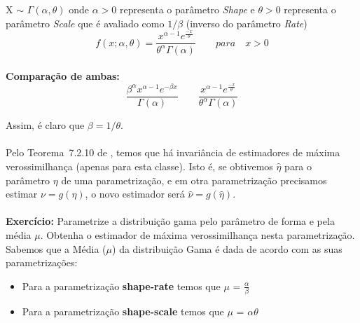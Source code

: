 X $\sim$ \begin{math} \Gamma(\alpha, \theta) \end{math} onde \begin{math} \alpha > 0 \end{math} representa o parâmetro \textit{Shape} e \begin{math} \theta > 0 \end{math} representa o parâmetro \textit{Scale} que é avaliado como \begin{math} 1/ \beta \end{math} (inverso do parâmetro \textit{Rate})
\begin{equation}
f(x; \alpha, \theta )=\frac{x^{\alpha-1}e^{\frac{-x}{\theta}}}{\theta^{\alpha}\Gamma(\alpha)} \qquad para \quad x > 0
\end{equation}\\

\textbf{Comparação de ambas:}\\

\begin{equation}
\frac{\beta^{\alpha}x^{\alpha-1}e^{-\beta x}}{\Gamma(\alpha)} \qquad \frac{x^{\alpha-1}e^{\frac{-x}{\theta}}}{\theta^{\alpha}\Gamma(\alpha)}
\end{equation}

Assim, é claro que $\beta = 1/\theta$.\\\\

Pelo Teorema~7.2.10 de \citet{CasellaBergerStatisticalInference}, temos que há invariância de estimadores de máxima verossimilhança (apenas para esta classe).
Isto é, se obtivemos $\widehat{\eta}$ para o parâmetro $\eta$ de uma parametrização, e em otra parametrização precisamos estimar $\nu=g(\eta)$, o novo estimador será $\widehat{\nu}=g(\widehat{\eta})$.\\\\

\textbf{Exercício:} Parametrize a distribuição gama pelo parâmetro de forma e pela média $\mu$.
Obtenha o estimador de máxima verossimilhança nesta parametrização.\\

Sabemos que a Média ($\mu$) da distribuição Gama é dada de acordo com as suas parametrizações:

\begin{itemize}
\item Para a parametrização \textbf{shape-rate} temos que $\mu$ = $\frac{\alpha}{\beta}$
\item Para a parametrização \textbf{shape-scale} temos que $\mu$ = $\alpha \theta$
\end{itemize}

